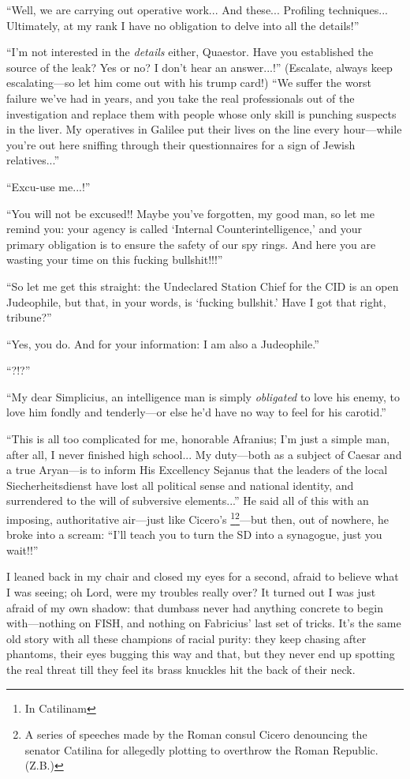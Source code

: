 ``Well, we are carrying out operative work... And these... Profiling techniques... Ultimately, at my rank I have no obligation to delve into all the details!''

``I'm not interested in the \emph{details} either, Quaestor. Have you established the source of the leak? Yes or no? I don't hear an answer...!'' (Escalate, always keep escalating---so let him come out with his trump card!) ``We suffer the worst failure we've had in years, and you take the real professionals out of the investigation and replace them with people whose only skill is punching suspects in the liver. My operatives in Galilee put their lives on the line every hour---while you're out here sniffing through their questionnaires for a sign of Jewish relatives...'' 

``Excu-use me...!''

``You will not be excused!! Maybe you've forgotten, my good man, so let me remind you: your agency is called `Internal Counterintelligence,' and your primary obligation is to ensure the safety of our spy rings. And here you are wasting your time on this fucking bullshit!!!''

``So let me get this straight: the Undeclared Station Chief for the CID is an open Judeophile, but that, in your words, is `fucking bullshit.' Have I got that right, tribune?''

``Yes, you do. And for your information: I am also a Judeophile.''

``?!?''

``My dear Simplicius, an intelligence man is simply \emph{obligated} to love his enemy, to love him fondly and tenderly---or else he'd have no way to feel for his carotid.''

``This is all too complicated for me, honorable Afranius; I'm just a simple man, after all, I never finished high school... My duty---both as a subject of Caesar and a true Aryan---is to inform His Excellency Sejanus that the leaders of the local Siecherheitsdienst have lost all political sense and national identity, and surrendered to the will of subversive elements...'' He said all of this with an imposing, authoritative air---just like Cicero's \footnote{In Catilinam}\footnote{A series of speeches made by the Roman consul Cicero denouncing the senator Catilina for allegedly plotting to overthrow the Roman Republic. (Z.B.)}---but then, out of nowhere, he broke into a scream: ``I'll teach you to turn the SD into a synagogue, just you wait!!''

I leaned back in my chair and closed my eyes for a second, afraid to believe what I was seeing; oh Lord, were my troubles really over? It turned out I was just afraid of my own shadow: that dumbass never had anything concrete to begin with---nothing on FISH, and nothing on Fabricius' last set of tricks. It's the same old story with all these champions of racial purity: they keep chasing after phantoms, their eyes bugging this way and that, but they never end up spotting the real threat till they feel its brass knuckles hit the back of their neck.

